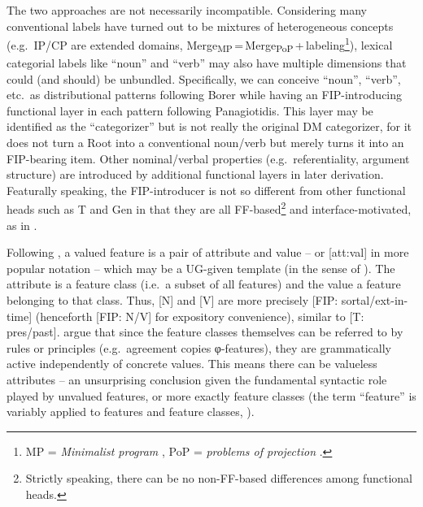 \documentclass[output=paper]{langsci/langscibook}
\begin{document}
The two approaches are not necessarily incompatible. Considering many
conventional labels have turned out to be mixtures of heterogeneous concepts
(e.g.\ IP/CP are extended domains,
Merge\textsubscript{MP}\,=\,Merge\textsubscript{PoP}\,+\,labeling\footnote{MP =
    {\em Minimalist program} \citep{Chomsky1995}, PoP = {\em problems of
projection} \citep{Chomsky2013}.}), lexical categorial labels like ``noun'' and
``verb'' may also have multiple dimensions that could (and should) be
unbundled.  Specifically, we can conceive ``noun'', ``verb'', etc.\ as
distributional patterns following Borer while having an FIP-introducing
functional layer in each pattern following Panagiotidis. This layer may be
identified as the ``categorizer'' but is not really the original \gls{DM}
categorizer, for it does not turn a Root into a conventional noun/verb but
merely turns it into an FIP-bearing item. Other nominal/verbal properties
(e.g.\ referentiality, argument structure) are introduced by additional
functional layers in later derivation. Featurally speaking, the FIP-introducer
is not so different from other functional heads such as T and Gen in that they
are all FF-based\footnote{Strictly speaking, there can be no non-FF-based
    differences among functional heads.} and interface-motivated, as in
    .

\begin{table}
\caption{Parallelism between \gls{FIP} and other functional categories\label{tab:1:parallelism}}
\end{table}

Following \citet{AdgerSvenonius2011}, a valued feature is a pair of attribute
and value  -- or [att:val] in more popular notation -- which may
be a UG-given template (in the sense of \citealt{Biberauer2016}). The attribute
is a feature class (i.e.\ a subset of all features) and the value a feature
belonging to that class. Thus, [N] and [V] are more precisely [FIP:
sortal/ext-in-time] (henceforth [FIP: N/V] for expository convenience), similar
to [T: pres/past]. \citeauthor{AdgerSvenonius2011} argue that since the feature
classes themselves can be referred to by rules or principles (e.g.\ agreement
copies φ-features), they are grammatically active independently of
concrete values. This means there can be valueless attributes -- an
unsurprising conclusion given the fundamental syntactic role played by unvalued
features, or more exactly feature classes (the term ``feature'' is variably
applied to features and feature classes, \citealt[35]{AdgerSvenonius2011}).
\end{document}
